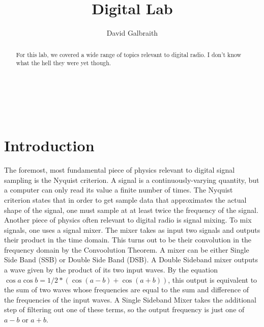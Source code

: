 \documentclass[11pt]{article}
\begin{document}
\title{Digital Lab}
\author{David Galbraith}
\maketitle

\normalsize
\begin{abstract}  %

For this lab, we covered a wide range of topics relevant to digital
radio. I don't know what the hell they were yet though. %

\end{abstract}


\medskip                        %

\thispagestyle{plain}

\section{Introduction}
The foremost, most fundamental piece of physics relevant to digital
signal sampling is the Nyquist criterion. A signal is a
continuously-varying quantity, but a computer can only read its value a
finite number of times. The Nyquist criterion states that in order to
get sample data that approximates the actual shape of the signal, one
must sample at at least twice the frequency of the signal. \\

Another piece of physics often relevant to digital radio is signal mixing. To mix signals, one uses a signal mixer. The mixer takes as input two signals and outputs their product in the time domain. This turns out to be their convolution in the frequency domain by the Convoolution Theorem. A mixer can be either Single Side Band (SSB) or Double Side Band (DSB). A Double Sideband mixer outputs a wave given by the product of its two input waves. By the equation $\cos{a}\cos{b} = 1/2 * (\cos{(a - b)} + \cos{(a + b)})$, this output is equivalent to the sum of two waves whose frequencies are equal to the sum and difference of the frequencies of the input waves. A Single Sideband Mixer takes the additional step of filtering out one of these terms, so the output frequency is just one of $a - b$ or $a + b$.
\end{document}
